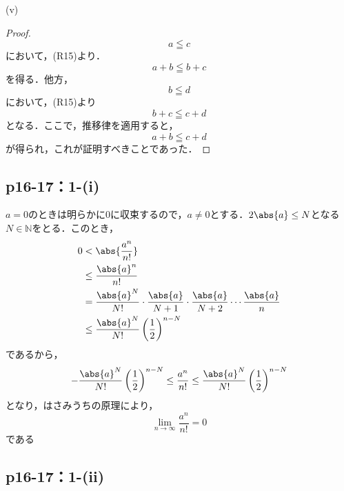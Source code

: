 \documentclass[a4paper,10pt,fleqn]{ltjsarticle}
\begin{document}
        \begin{itembox}[c]{(v)}
            \begin{proof}
                \[
                    a \leqq c
                \]
                において，(R15)より．
                \[
                    a+b \leqq b+c
                \]
                を得る．他方，
                \[
                    b \leqq d
                \]
                において，(R15)より
                \[
                    b + c \leqq c+d
                \]
                となる．ここで，推移律を適用すると，
                \[
                    a+b \leqq c+d
                \]
                が得られ，これが証明すべきことであった．
            \end{proof}
            \end{itembox}
%
\subsection*{p16-17：1-(i)}

\begin{tleftbar}
    $a=0$のときは明らかに$0$に収束するので，$a \ne 0$とする．$2\abs{a} \le N$となる$N \in \mathbb{N}$をとる．このとき，
    \begin{align*}
         0 &< \abs{ \frac{a^n}{n!} } \\
         &\le \frac{\abs{a}^n}{n!} \\
         &= \frac{\abs{a}^{N}}{N!} \cdot \frac{\abs{a}}{N+1} \cdot \frac{\abs{a}}{N+2} \dotsm \frac{\abs{a}}{n} \\
         & \le  \frac{\abs{a}^{N}}{N!} \left(\frac{1}{2} \right)^{n-N}
    \end{align*}
    であるから，
    \[
        - \frac{\abs{a}^{N}}{N!} \left(\frac{1}{2} \right)^{n-N} \le  \frac{a^n}{n!} \le \frac{\abs{a}^{N}}{N!} \left(\frac{1}{2} \right)^{n-N}
    \]
    となり，はさみうちの原理により，
    \[
        \lim_{n \to \infty} \frac{a^n}{n!} =0
    \]
    である
\end{tleftbar}

\subsection*{p16-17：1-(ii)}
\end{document}
